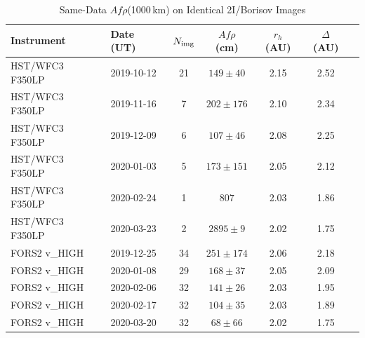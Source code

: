 \documentclass[usenatbib]{mnras}
\begin{document}
\begin{table}
\centering
\caption{Same-Data $Af\rho$(1000\,km) on Identical 2I/Borisov Images}\label{tab:same_data}
\begin{tabular}{llccccc}
\toprule
Instrument & Date (UT) & $N_{\rm img}$ & $Af\rho$ (cm) & $r_h$ (AU) & $\Delta$ (AU) \\
\midrule
HST/WFC3 F350LP & 2019-10-12 & 21 & $149 \pm 40$  & 2.15 & 2.52 \\
HST/WFC3 F350LP & 2019-11-16 &  7 & $202 \pm 176$ & 2.10 & 2.34 \\
HST/WFC3 F350LP & 2019-12-09 &  6 & $107 \pm 46$  & 2.08 & 2.25 \\
HST/WFC3 F350LP & 2020-01-03 &  5 & $173 \pm 151$ & 2.05 & 2.12 \\
HST/WFC3 F350LP & 2020-02-24 &  1 & $807$         & 2.03 & 1.86 \\
HST/WFC3 F350LP & 2020-03-23 &  2 & $2895 \pm 9$   & 2.02 & 1.75 \\
\midrule
FORS2 v\_HIGH    & 2019-12-25 & 34 & $251 \pm 174$ & 2.06 & 2.18 \\
FORS2 v\_HIGH    & 2020-01-08 & 29 & $168 \pm 37$  & 2.05 & 2.09 \\
FORS2 v\_HIGH    & 2020-02-06 & 32 & $141 \pm 26$  & 2.03 & 1.95 \\
FORS2 v\_HIGH    & 2020-02-17 & 32 & $104 \pm 35$  & 2.03 & 1.89 \\
FORS2 v\_HIGH    & 2020-03-20 & 32 & $68 \pm 66$   & 2.02 & 1.75 \\
\bottomrule
\end{tabular}

\end{table}
\end{document}
